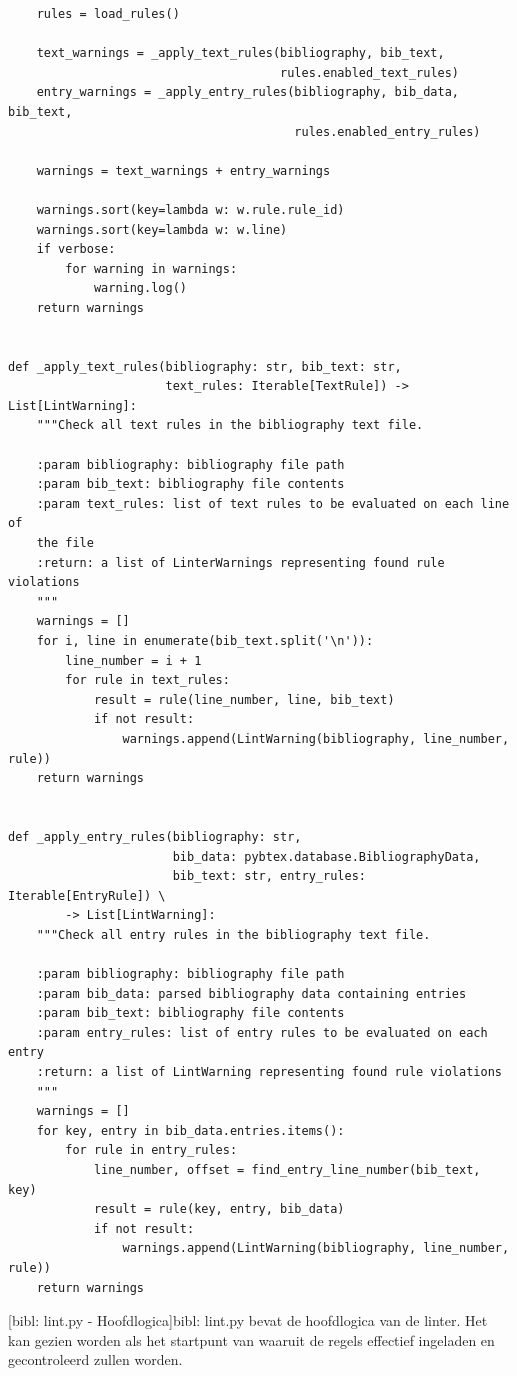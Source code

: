 \begin{verbatim}
    rules = load_rules()

    text_warnings = _apply_text_rules(bibliography, bib_text,
                                      rules.enabled_text_rules)
    entry_warnings = _apply_entry_rules(bibliography, bib_data, bib_text,
                                        rules.enabled_entry_rules)

    warnings = text_warnings + entry_warnings

    warnings.sort(key=lambda w: w.rule.rule_id)
    warnings.sort(key=lambda w: w.line)
    if verbose:
        for warning in warnings:
            warning.log()
    return warnings


def _apply_text_rules(bibliography: str, bib_text: str,
                      text_rules: Iterable[TextRule]) -> List[LintWarning]:
    """Check all text rules in the bibliography text file.

    :param bibliography: bibliography file path
    :param bib_text: bibliography file contents
    :param text_rules: list of text rules to be evaluated on each line of
    the file
    :return: a list of LinterWarnings representing found rule violations
    """
    warnings = []
    for i, line in enumerate(bib_text.split('\n')):
        line_number = i + 1
        for rule in text_rules:
            result = rule(line_number, line, bib_text)
            if not result:
                warnings.append(LintWarning(bibliography, line_number, rule))
    return warnings


def _apply_entry_rules(bibliography: str,
                       bib_data: pybtex.database.BibliographyData,
                       bib_text: str, entry_rules: Iterable[EntryRule]) \
        -> List[LintWarning]:
    """Check all entry rules in the bibliography text file.

    :param bibliography: bibliography file path
    :param bib_data: parsed bibliography data containing entries
    :param bib_text: bibliography file contents
    :param entry_rules: list of entry rules to be evaluated on each entry
    :return: a list of LintWarning representing found rule violations
    """
    warnings = []
    for key, entry in bib_data.entries.items():
        for rule in entry_rules:
            line_number, offset = find_entry_line_number(bib_text, key)
            result = rule(key, entry, bib_data)
            if not result:
                warnings.append(LintWarning(bibliography, line_number, rule))
    return warnings
\end{verbatim}
[bibl: lint.py - Hoofdlogica]{bibl: lint.py bevat de hoofdlogica van de linter. Het kan gezien worden als het startpunt van waaruit de regels effectief ingeladen en gecontroleerd zullen worden. \label{lst:bibl_lint_mainlogic}}
